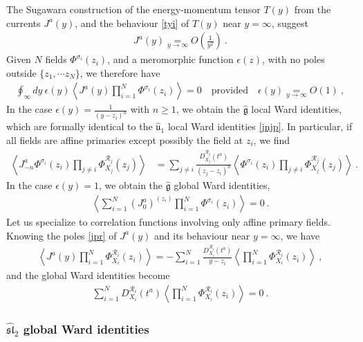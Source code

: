 \documentclass[12pt, a4paper, notitlepage, twoside]{report}
\numberwithin{equation}{section}
\theoremstyle{break}
\begin{document}
The Sugawara construction of the energy-momentum tensor $T(y)$ from the currents $J^a(y)$, and the behaviour \eqref{tyi} of $T(y)$ near $y=\infty$, suggest
\begin{align}
 \boxed{J^a(y) \underset{y\to \infty}{=} O\left(\frac{1}{y^2}\right)}\ .
\label{jayi}
\end{align}
Given $N$ fields $\Phi^{\sigma_i}(z_i)$, and a meromorphic function $\epsilon(z)$, with no poles outside $\{z_1,\cdots z_N\}$, we therefore have 
\begin{align}
 \oint_\infty dy\ \epsilon(y) \left\langle J^a(y)  \prod_{i=1}^N \Phi^{\sigma_i}(z_i)\right\rangle = 0 \quad \text{provided} \quad \epsilon(y) \underset{y\to\infty}{=} O(1)\ ,
\end{align}
In the case $\epsilon(y)=\frac{1}{(y-z_i)^n}$ with $n\geq 1$, we obtain the $\hat{\mathfrak{g}}$ local Ward identities, which are formally identical to the $\hat{\mathfrak{u}}_1$ local Ward identities \eqref{jnjp}. 
In particular, if all fields are affine primaries except possibly the field at $z_i$, we find 
\begin{align}
\left\langle J^a_{-n}\Phi^{\sigma_i}(z_i)\prod_{j\neq i} \Phi^{\mathcal{R}_j}_{X_j}(z_j)\right\rangle &=\sum_{j\neq i} \frac{D_{X_j}^{\mathcal{R}_j}(t^a)}{(z_j-z_i)^n} \left\langle \Phi^{\sigma_i}(z_i)\prod_{j\neq i} \Phi^{\mathcal{R}_j}_{X_j}(z_j)\right\rangle\ . 
\label{jmnz}
\end{align}
In the case $\epsilon(y)=1$, we obtain the $\hat{\mathfrak{g}}$ global Ward identities,
\begin{align}
 \left\langle \sum_{i=1}^N (J_0^a)^{(z_i)} \prod_{i=1}^N \Phi^{\sigma_i}(z_i)\right\rangle=0\ .
\end{align}
Let us specialize to correlation functions involving only affine primary fields.
Knowing the poles \eqref{jpr} of $J^a(y)$ and its behaviour near $y=\infty$, we have
\begin{align}
 \left\langle J^a(y) \prod_{i=1}^N \Phi^{\mathcal{R}_i}_{X_i}(z_i)\right\rangle = - \sum_{i=1}^N \frac{D^{\mathcal{R}_i}_{X_i}(t^a)}{y-z_i}\left\langle \prod_{i=1}^N \Phi^{\mathcal{R}_i}_{X_i}(z_i)\right\rangle\ ,
\label{dja}
\end{align}
and the global Ward identities become
\begin{align}
 \sum_{i=1}^N D_{X_i}^{\mathcal{R}_i}(t^a) \left\langle \prod_{i=1}^N \Phi^{\mathcal{R}_i}_{X_i}(z_i)\right\rangle   = 0 \ .
\label{drxt}
\end{align}

\subsubsection{$\widehat{\mathfrak{sl}}_2$ global Ward identities}
\end{document}
